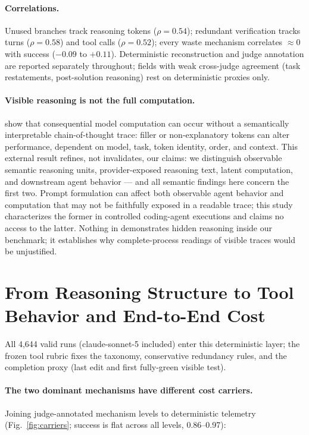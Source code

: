 \documentclass[11pt]{article}
\newcommand{\citet}[1]{\cite{#1}}
\begin{document}
\paragraph{Correlations.} Unused branches track reasoning tokens
($\rho=0.54$); redundant verification tracks turns ($\rho=0.58$) and tool
calls ($\rho=0.52$); every waste mechanism correlates $\approx0$ with
success ($-0.09$ to $+0.11$). Deterministic reconstruction and judge
annotation are reported separately throughout; fields with weak
cross-judge agreement (task restatements, post-solution reasoning) rest
on deterministic proxies only.

\paragraph{Visible reasoning is not the full computation.}
\citet{baherwani2026} show that consequential model computation can occur
without a semantically interpretable chain-of-thought trace: filler or
non-explanatory tokens can alter performance, dependent on model, task,
token identity, order, and context. This external result refines, not
invalidates, our claims: we distinguish observable semantic reasoning
units, provider-exposed reasoning text, latent computation, and downstream
agent behavior --- and all semantic findings here concern the first two.
Prompt formulation can affect both observable agent behavior and
computation that may not be faithfully exposed in a readable trace; this
study characterizes the former in controlled coding-agent executions and
claims no access to the latter. Nothing in \citet{baherwani2026}
demonstrates hidden reasoning inside our benchmark; it establishes why
complete-process readings of visible traces would be unjustified.

\section{From Reasoning Structure to Tool Behavior and End-to-End Cost}

All 4{,}644 valid runs (claude-sonnet-5 included) enter this deterministic
layer; the frozen tool rubric fixes the taxonomy, conservative redundancy
rules, and the completion proxy (last edit and first fully-green visible
test).

\paragraph{The two dominant mechanisms have different cost carriers.}
Joining judge-annotated mechanism levels to deterministic telemetry
(Fig.~\ref{fig:carriers}; success is flat across all levels, 0.86--0.97):
\end{document}

